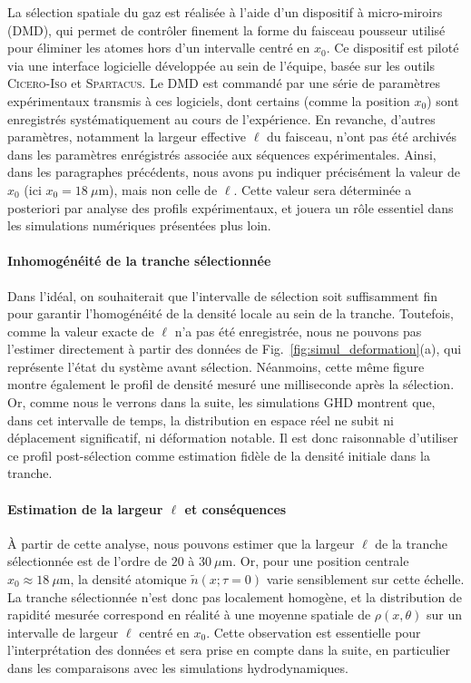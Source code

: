 La sélection spatiale du gaz est réalisée à l’aide d’un dispositif à micro-miroirs (DMD), qui permet de contrôler finement la forme du faisceau pousseur utilisé pour éliminer les atomes hors d’un intervalle centré en $x_0$. Ce dispositif est piloté via une interface logicielle développée au sein de l’équipe, basée sur les outils \textsc{Cicero-Iso} et \textsc{Spartacus}. Le DMD est commandé par une série de paramètres expérimentaux transmis à ces logiciels, dont certains (comme la position $x_0$) sont enregistrés systématiquement au cours de l’expérience. En revanche, d'autres paramètres, notamment la largeur effective $\ell$ du faisceau, n’ont pas été archivés dans les paramètres enrégistrés associée aux séquences expérimentales. Ainsi, dans les paragraphes précédents, nous avons pu indiquer précisément la valeur de $x_0$ (ici $x_0 = 18~\mu\mathrm{m}$), mais non celle de $\ell$. Cette valeur sera déterminée a posteriori par analyse des profils expérimentaux, et jouera un rôle essentiel dans les simulations numériques présentées plus loin.

\medskip
\paragraph{Inhomogénéité de la tranche sélectionnée}

Dans l'idéal, on souhaiterait que l’intervalle de sélection soit suffisamment fin pour garantir l’homogénéité de la densité locale au sein de la tranche. Toutefois, comme la valeur exacte de $\ell$ n’a pas été enregistrée, nous ne pouvons pas l’estimer directement à partir des données de Fig.~\ref{fig:simul_deformation}(a), qui représente l’état du système avant sélection. Néanmoins, cette même figure montre également le profil de densité mesuré une milliseconde après la sélection. Or, comme nous le verrons dans la suite, les simulations GHD montrent que, dans cet intervalle de temps, la distribution en espace réel ne subit ni déplacement significatif, ni déformation notable. Il est donc raisonnable d’utiliser ce profil post-sélection comme estimation fidèle de la densité initiale dans la tranche.

\medskip
\paragraph{Estimation de la largeur $\ell$ et conséquences}

À partir de cette analyse, nous pouvons estimer que la largeur $\ell$ de la tranche sélectionnée est de l’ordre de $20$ à $30~\mu\mathrm{m}$. Or, pour une position centrale $x_0 \approx 18~\mu\mathrm{m}$, la densité atomique $\tilde{n}(x ; \tau = 0 )$ varie sensiblement sur cette échelle. La tranche sélectionnée n’est donc pas localement homogène, et la distribution de rapidité mesurée correspond en réalité à une moyenne spatiale de $\rho(x,\theta)$ sur un intervalle de largeur $\ell$ centré en $x_0$. Cette observation est essentielle pour l’interprétation des données et sera prise en compte dans la suite, en particulier dans les comparaisons avec les simulations hydrodynamiques.


